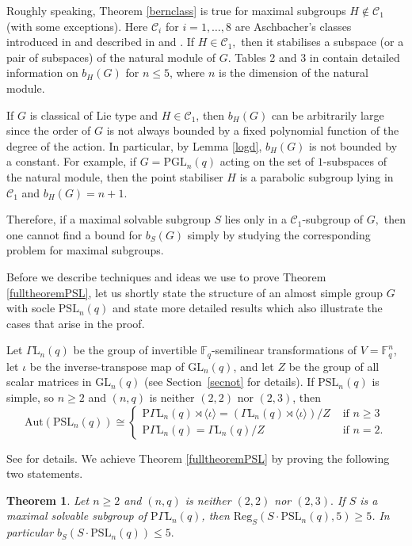 \documentclass[a4paper,reqno,11pt]{amsart}
\newtheorem{mainthA}{Theorem}
\theoremstyle{definition}
\theoremstyle{remark}
\numberwithin{equation}{section}
\newcommand{\Reg}{\mathrm{Reg}}
\newcommand{\Aut}{\mathrm{Aut}}
\newcommand{\GaL}{{\Gamma \mathrm{L}}}
\newcommand{\PGaL}{{\mathrm{P}\Gamma \mathrm{L}}}
\newcommand{\PSL}{{\mathrm{PSL}}}
\newcommand{\GL}{{\mathrm{GL}}}
\newcommand{\PGL}{{\mathrm{PGL}}}
\begin{document}
Roughly speaking, Theorem \ref{bernclass} is true for maximal subgroups $H \notin \mathcal{C}_1$ (with some exceptions). Here $\mathcal{C}_i$ for $i=1, \ldots, 8$ are Aschbacher's classes introduced in \cite{asch}   and described in \cite[\S 2.1]{maxlow}  and \cite[Chapter 4]{kleidlieb}.  If $H \in \mathcal{C}_1,$ then it stabilises a subspace (or a pair of subspaces) of the natural module of $G$. Tables 2 and 3 in \cite{burness} contain detailed information on $b_H(G)$ for $n\le 5$, where $n$ is the dimension of the natural module.

If $G$ is classical of Lie type and $H \in \mathcal{C}_1$, then $b_H(G)$ can be arbitrarily large since the order
of $G$ is not always bounded by a fixed polynomial function of the degree of the action.  In particular, by Lemma \ref{logd}, $b_H(G)$ is not bounded by a constant. For example, if $G=\PGL_n(q)$ acting on the set of $1$-subspaces of the natural module, then the point stabiliser $H$ is a parabolic subgroup lying in  $\mathcal{C}_1$ and $b_H(G)=n+1.$ 

 Therefore,  if a maximal solvable subgroup $S$ lies only in a $\mathcal{C}_1$-subgroup of $G,$ then one cannot find a bound for $b_S(G)$ simply by studying the corresponding problem for maximal subgroups.
 
 \medskip
 
 Before we describe techniques and ideas we use to prove  Theorem \ref{fulltheoremPSL},  %
 let us shortly state the structure of an almost simple group $G$ with socle $\PSL_n(q)$ and state more detailed results which also illustrate the cases that arise in the proof.
 
 Let $\GaL_n(q)$ be the group of invertible $\mathbb{F}_q$-semilinear transformations of $V=\mathbb{F}_q^n$, let  $\iota$ be the inverse-transpose map of $\GL_n(q)$, and let $Z$ be the group of all scalar matrices in $\GL_n(q)$ (see Section~\ref{secnot} for details). If $\PSL_n(q)$ is simple, so $n \ge 2$ and $(n,q)$ is neither $(2,2)$ nor $(2,3)$, then $$\Aut(\PSL_n(q)) \cong 
 \begin{cases}
 \PGaL_n(q) \rtimes \langle \iota \rangle =  ( \GaL_n(q) \rtimes \langle \iota \rangle)/Z & \text{ if } n \ge 3 \\
  \PGaL_n(q) =  \GaL_n(q) /Z & \text{ if } n = 2.
 \end{cases}$$
 
See \cite{Dieu} for details.  We achieve Theorem \ref{fulltheoremPSL} by proving the following two statements. 
\begin{mainthA}
\label{theorem}
Let $n \ge 2$ and $(n,q)$ is neither $(2,2)$ nor $(2,3).$ If $S$ is a maximal solvable subgroup of $\PGaL_n(q)$, 
 then $\Reg_S(S \cdot \PSL_n(q),5)\ge 5$. In particular $b_S(S \cdot \PSL_n(q)) \le 5.$
\end{mainthA}
\end{document}
